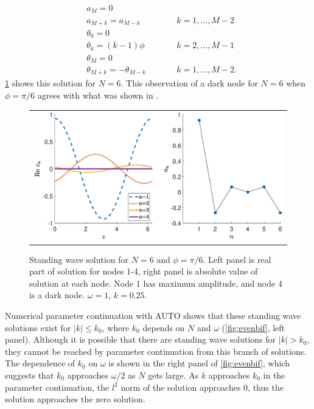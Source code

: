 \documentclass[12pt,reqno]{amsart}
\begin{document}
\begin{align*}
&a_M = 0 \\
&a_{M+k} = a_{M-k} && \qquad k = 1, \dots, M-2 \\
&\theta_0 = 0 \\
&\theta_k = (k-1)\phi && \qquad  k = 2, \dots, M-1 \\
&\theta_M = 0 \\
&\theta_{M+k} = -\theta_{M-k} && \qquad k = 1, \dots, M-2.
\end{align*}
\cref{fig:evenhole6} shows this solution for $N=6$. This observation of a dark node for $N = 6$ when $\phi = \pi/6$ agrees with what was shown in \cite{castro2016}. 
\begin{figure}[H]
\begin{center}
\begin{tabular}{c}
\includegraphics[width=15cm]{images/evenhole6.eps}
\end{tabular}
\end{center}
\caption{Standing wave solution for $N = 6$ and $\phi = \pi/6$. Left panel is real part of solution for nodes 1-4, right panel is absolute value of solution at each node. Node 1 has maximum amplitude, and node 4 is a dark node. $\omega = 1$, $k = 0.25$.}
\label{fig:evenhole6}
\end{figure}
Numerical parameter continuation with AUTO shows that these standing wave solutions exist for $|k| \leq k_0$, where $k_0$ depends on $N$ and $\omega$ (\cref{fig:evenbif}, left panel). Although it is possible that there are standing wave solutions for $|k| > k_0$, they cannot be reached by parameter continuation from this branch of solutions. The dependence of $k_0$ on $\omega$ is shown in the right panel of \cref{fig:evenbif}, which suggests that $k_0$ approaches $\omega/2$ as $N$ gets large. As $k$ approaches $k_0$ in the parameter continuation, the $l^2$ norm of the solution approaches 0, thus the solution approaches the zero solution. 
\end{document}

